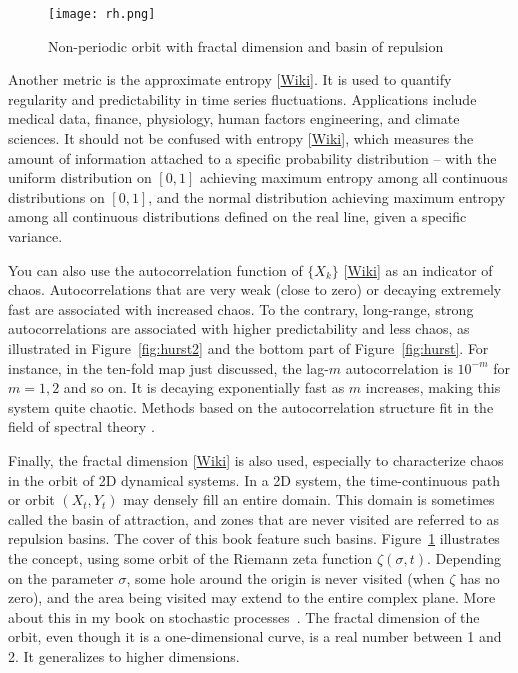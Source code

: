 \documentclass[oneside,10pt]{book}
\begin{document}
\begin{figure}[H]
\centering
\texttt{[image: rh.png]}  %
\caption{Non-periodic orbit with fractal dimension and basin of repulsion}
\label{fig:rheye}
\end{figure}

Another metric is the \textcolor{index}{approximate entropy} [\href{https://en.wikipedia.org/wiki/Approximate_entropy}{Wiki}].
It is used to quantify regularity and predictability in time series fluctuations. Applications include medical data, finance, physiology, human factors engineering, and climate sciences. 
It should not be confused with \textcolor{index}{entropy} [\href{https://en.wikipedia.org/wiki/Entropy}{Wiki}], which measures the amount of information attached to a specific probability distribution -- with the uniform distribution on $[0, 1]$ achieving maximum entropy among all continuous distributions on $[0, 1]$, and the normal distribution achieving maximum entropy among all continuous distributions defined on the real line, given a specific variance. 



You can also use the \textcolor{index}{autocorrelation function} of $\{X_k\}$ [\href{https://en.wikipedia.org/wiki/Autocorrelation}{Wiki}] as an indicator of chaos. Autocorrelations that are very weak (close to zero) or
 decaying extremely fast are associated with increased chaos. To the contrary, long-range, strong autocorrelations are associated with higher predictability and less chaos, as illustrated in Figure~\ref{fig:hurst2} and the bottom part of Figure~\ref{fig:hurst}. 
For instance, in the ten-fold map just discussed, the lag-$m$ autocorrelation is $10^{-m}$ for $m=1,2$ and so on. It is decaying exponentially fast as $m$ increases, making this system quite chaotic.   Methods based on the autocorrelation structure fit in the field of \textcolor{index}{spectral theory} \cite{spectral2020}.

Finally, the \textcolor{index}{fractal dimension} [\href{https://en.wikipedia.org/wiki/Fractal_dimension}{Wiki}] is also used, especially to characterize chaos in the 
\textcolor{index}{orbit} of 2D dynamical systems. In a 2D system,
 the time-continuous path or orbit $(X_t, Y_t)$ may densely fill an entire domain. This domain is sometimes called the 
\textcolor{index}{basin of attraction}, and zones that are never visited are referred to as
 \textcolor{index}{repulsion basins}. The cover of this book feature such basins.  Figure~\ref{fig:rheye} illustrates
 the concept, using some orbit of the \textcolor{index}{Riemann zeta function} $\zeta(\sigma,t)$. Depending on the parameter $\sigma$, some hole around the origin is never visited (when $\zeta$ has no zero), and the area being visited may extend to the entire complex plane. More about this in my book on stochastic processes~\cite{vgsimulnew}. 
 The fractal dimension of the orbit, even though it is a one-dimensional curve, is a real number between 1 and 2. It generalizes to higher dimensions.
\end{document}

